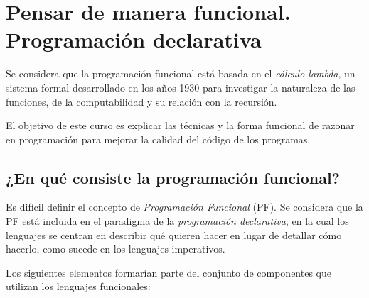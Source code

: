 \chapter{Pensar de manera funcional. Programación declarativa}
\label{ch_intro}

\IndiceCapitulo
\begin{Resumen}
   Se considera que la programación funcional está basada en el \textit{cálculo lambda},  un sistema formal desarrollado en los años 1930 para investigar la naturaleza de las funciones, de la computabilidad y su relación con la recursión. 
   
   \smallskip
   
   El objetivo de este curso es explicar las técnicas y la forma funcional de razonar en programación para mejorar la calidad del código de los programas.
\end{Resumen}

\section{¿En qué consiste la programación funcional?}
Es difícil definir el concepto de \textit{Programación Funcional} (PF). Se considera que la PF está incluida en el paradigma de la \textit{programación declarativa}, en la cual los lenguajes se centran en describir qué quieren hacer en lugar de detallar cómo hacerlo, como sucede en los lenguajes imperativos.

Los siguientes elementos formarían parte del conjunto de componentes que utilizan los lenguajes funcionales:

